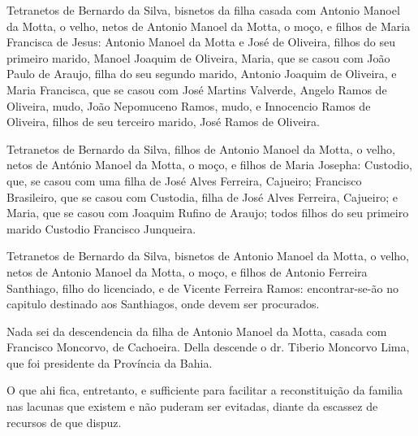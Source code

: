 Tetranetos de Bernardo da Silva, bisnetos da filha casada com Antonio Manoel da Motta, o velho, netos de Antonio Manoel da Motta, o moço, e filhos de Maria Francisca de Jesus: Antonio Manoel da Motta e José de Oliveira, filhos do seu primeiro marido, Manoel Joaquim de Oliveira, Maria, que se casou com João Paulo de Araujo, filha do seu segundo marido, Antonio Joaquim de Oliveira, e Maria Francisca, que se casou com José Martins Valverde, Angelo Ramos de Oliveira, mudo, João Nepomuceno Ramos, mudo, e Innocencio Ramos de Oliveira, filhos de seu terceiro marido, José Ramos de Oliveira.

Tetranetos de Bernardo da Silva, filhos de Antonio Manoel da Motta, o velho, netos de António Manoel da Motta, o moço, e filhos de Maria Josepha: Custodio, que, se casou com uma filha de José Alves Ferreira, Cajueiro; Francisco Brasileiro, que se casou com Custodia, filha de José Alves Ferreira, Cajueiro; e Maria, que se casou com Joaquim Rufino de Araujo; todos filhos do seu primeiro marido Custodio Francisco Junqueira.

Tetranetos de Bernardo da Silva, bisnetos de Antonio Manoel da Motta, o velho, netos de Antonio Manoel da Motta, o moço, e filhos de Antonio Ferreira Santhiago, filho do licenciado, e de Vicente Ferreira Ramos: encontrar-se-ão no capitulo destinado aos Santhiagos, onde devem ser procurados.

Nada sei da descendencia da filha de Antonio Manoel da Motta, casada com Francisco Moncorvo, de Cachoeira. Della descende o dr. Tiberio Moncorvo Lima, que foi presidente da Província da Bahia.

O que ahi fica, entretanto, e sufficiente para facilitar a reconstituição da familia nas lacunas que existem e não puderam ser evitadas, diante da escassez de recursos de que dispuz.

